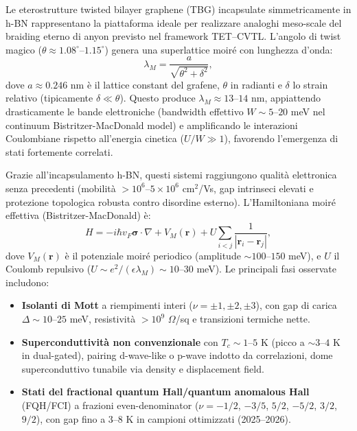 \documentclass[11pt,a4paper]{article}
\theoremstyle{plain}
\theoremstyle{definition}
\begin{document}
Le eterostrutture twisted bilayer graphene (TBG) incapsulate simmetricamente in h-BN rappresentano la piattaforma ideale per realizzare analoghi meso-scale del braiding eterno di anyon previsto nel framework TET--CVTL. L'angolo di twist magico ($\theta \approx 1.08^\circ$--$1.15^\circ$) genera una superlattice moiré con lunghezza d'onda:
\begin{equation}
\lambda_M = \frac{a}{\sqrt{\theta^2 + \delta^2}},
\end{equation}
dove $a \approx 0.246$ nm è il lattice constant del grafene, $\theta$ in radianti e $\delta$ lo strain relativo (tipicamente $\delta \ll \theta$). Questo produce $\lambda_M \approx 13$--$14$ nm, appiattendo drasticamente le bande elettroniche (bandwidth effettivo $W \sim 5$--$20$ meV nel continuum Bistritzer-MacDonald model) e amplificando le interazioni Coulombiane rispetto all'energia cinetica ($U/W \gg 1$), favorendo l'emergenza di stati fortemente correlati.

Grazie all'incapsulamento h-BN, questi sistemi raggiungono qualità elettronica senza precedenti (mobilità $> 10^6$--$5 \times 10^6$ cm$^2$/Vs, gap intrinseci elevati e protezione topologica robusta contro disordine esterno). L'Hamiltoniana moiré effettiva (Bistritzer-MacDonald) è:
\begin{equation}
H = -i \hbar v_F \boldsymbol{\sigma} \cdot \nabla + V_M(\mathbf{r}) + U \sum_{i<j} \frac{1}{|\mathbf{r}_i - \mathbf{r}_j|},
\end{equation}
dove $V_M(\mathbf{r})$ è il potenziale moiré periodico (amplitude $\sim 100$--$150$ meV), e $U$ il Coulomb repulsivo ($U \sim e^2 / (\epsilon \lambda_M) \sim 10$--$30$ meV). Le principali fasi osservate includono:

\begin{itemize}
    \item \textbf{Isolanti di Mott} a riempimenti interi ($\nu = \pm 1, \pm 2, \pm 3$), con gap di carica $\Delta \sim 10$--$25$ meV, resistività $> 10^9$ $\Omega$/sq e transizioni termiche nette.
    \item \textbf{Superconduttività non convenzionale} con $T_c \sim 1$--$5$ K (picco a $\sim 3$--$4$ K in dual-gated), pairing d-wave-like o p-wave indotto da correlazioni, dome superconduttivo tunabile via density e displacement field.
    \item \textbf{Stati del fractional quantum Hall/quantum anomalous Hall} (FQH/FCI) a frazioni even-denominator ($\nu = -1/2$, $-3/5$, $5/2$, $-5/2$, $3/2$, $9/2$), con gap fino a $3$--$8$ K in campioni ottimizzati (2025--2026).
\end{itemize}
\end{document}
